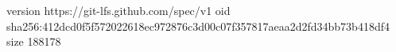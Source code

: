 version https://git-lfs.github.com/spec/v1
oid sha256:412dcd0f5f572022618ec972876c3d00c07f357817aeaa2d2fd34bb73b418df4
size 188178
